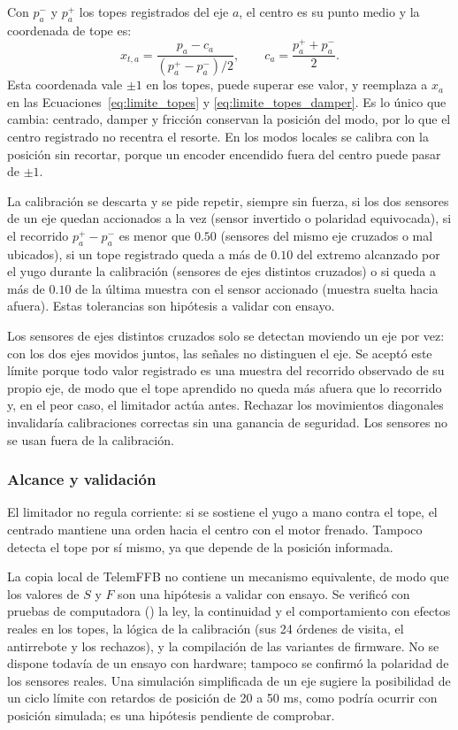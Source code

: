 Con $p_a^{-}$ y $p_a^{+}$ los topes registrados del eje $a$, el centro es su punto medio y la coordenada de tope es:
\begin{equation}
x_{t,a}=\frac{p_a-c_a}{\left(p_a^{+}-p_a^{-}\right)/2},\qquad c_a=\frac{p_a^{+}+p_a^{-}}{2}.
\label{eq:coordenada_tope}
\end{equation}
Esta coordenada vale $\pm1$ en los topes, puede superar ese valor, y reemplaza a $x_a$ en las Ecuaciones~\eqref{eq:limite_topes} y \eqref{eq:limite_topes_damper}. Es lo único que cambia: centrado, damper y fricción conservan la posición del modo, por lo que el centro registrado no recentra el resorte. En los modos locales se calibra con la posición sin recortar, porque un encoder encendido fuera del centro puede pasar de $\pm1$.

La calibración se descarta y se pide repetir, siempre sin fuerza, si los dos sensores de un eje quedan accionados a la vez (sensor invertido o polaridad equivocada), si el recorrido $p_a^{+}-p_a^{-}$ es menor que $0.50$ (sensores del mismo eje cruzados o mal ubicados), si un tope registrado queda a más de $0.10$ del extremo alcanzado por el yugo durante la calibración (sensores de ejes distintos cruzados) o si queda a más de $0.10$ de la última muestra con el sensor accionado (muestra suelta hacia afuera). Estas tolerancias son hipótesis a validar con ensayo.

Los sensores de ejes distintos cruzados solo se detectan moviendo un eje por vez: con los dos ejes movidos juntos, las señales no distinguen el eje. Se aceptó este límite porque todo valor registrado es una muestra del recorrido observado de su propio eje, de modo que el tope aprendido no queda más afuera que lo recorrido y, en el peor caso, el limitador actúa antes. Rechazar los movimientos diagonales invalidaría calibraciones correctas sin una ganancia de seguridad. Los sensores no se usan fuera de la calibración.

\subsubsection{Alcance y validación}
El limitador no regula corriente: si se sostiene el yugo a mano contra el tope, el centrado mantiene una orden hacia el centro con el motor frenado. Tampoco detecta el tope por sí mismo, ya que depende de la posición informada.

La copia local de TelemFFB no contiene un mecanismo equivalente, de modo que los valores de $S$ y $F$ son una hipótesis a validar con ensayo. Se verificó con pruebas de computadora () la ley, la continuidad y el comportamiento con efectos reales en los topes, la lógica de la calibración (sus 24 órdenes de visita, el antirrebote y los rechazos), y la compilación de las variantes de firmware. No se dispone todavía de un ensayo con hardware; tampoco se confirmó la polaridad de los sensores reales. Una simulación simplificada de un eje sugiere la posibilidad de un ciclo límite con retardos de posición de 20 a 50 ms, como podría ocurrir con posición simulada; es una hipótesis pendiente de comprobar.

